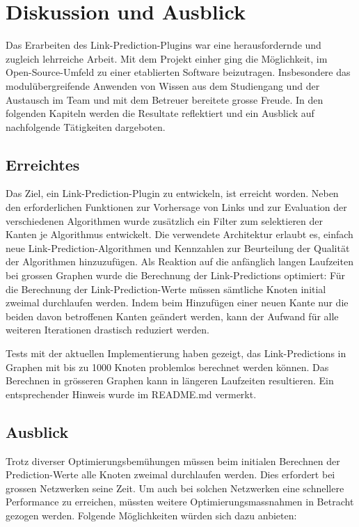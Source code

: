 \chapter{Diskussion und Ausblick}

Das Erarbeiten des Link-Prediction-Plugins war eine herausfordernde und zugleich lehrreiche Arbeit.
Mit dem Projekt einher ging die Möglichkeit, im Open-Source-Umfeld zu einer etablierten Software beizutragen.
Insbesondere das modulübergreifende Anwenden von Wissen aus dem Studiengang und der Austausch im Team und mit dem Betreuer bereitete grosse Freude.
In den folgenden Kapiteln werden die Resultate reflektiert und ein Ausblick auf nachfolgende Tätigkeiten dargeboten.

\section{Erreichtes}

Das Ziel, ein Link-Prediction-Plugin zu entwickeln, ist erreicht worden.
Neben den erforderlichen Funktionen zur Vorhersage von Links und zur Evaluation der verschiedenen Algorithmen wurde zusätzlich ein Filter zum selektieren der Kanten je Algorithmus entwickelt.
Die verwendete Architektur erlaubt es, einfach neue Link-Prediction-Algorithmen und Kennzahlen zur Beurteilung der Qualität der Algorithmen hinzuzufügen.
Als Reaktion auf die anfänglich langen Laufzeiten bei grossen Graphen wurde die Berechnung der Link-Predictions optimiert:
Für die Berechnung der Link-Prediction-Werte müssen sämtliche Knoten initial zweimal durchlaufen werden.
Indem beim Hinzufügen einer neuen Kante nur die beiden davon betroffenen Kanten geändert werden, kann der Aufwand für alle weiteren Iterationen drastisch reduziert werden.

Tests mit der aktuellen Implementierung haben gezeigt, das Link-Predictions in Graphen mit bis zu 1000 Knoten problemlos berechnet werden können.
Das Berechnen in grösseren Graphen kann in längeren Laufzeiten resultieren.
Ein entsprechender Hinweis wurde im README.md vermerkt.

\section{Ausblick}

Trotz diverser Optimierungsbemühungen müssen beim initialen Berechnen der Prediction-Werte alle Knoten zweimal durchlaufen werden.
Dies erfordert bei grossen Netzwerken seine Zeit.
Um auch bei solchen Netzwerken eine schnellere Performance zu erreichen, müssten weitere Optimierungsmassnahmen in Betracht gezogen werden.
Folgende Möglichkeiten würden sich dazu anbieten:


